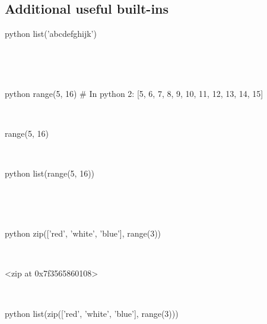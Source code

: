 \documentclass[aspectratio=1610,slidestop]{beamer}
\begin{document}
\subsection{Additional useful built-ins}
\begin{pframe}
 \begin{ipython}
  \begin{pythonin}{python}
list('abcdefghijk')
  \end{pythonin}
  \\
  \begin{pythonout}
['a', 'b', 'c', 'd', 'e', 'f', 'g', 'h', 'i', 'j', 'k']
  \end{pythonout}
  \\

  \begin{pythonin}{python}
range(5, 16)  # In python 2: [5, 6, 7, 8, 9, 10, 11, 12, 13, 14, 15]
  \end{pythonin}
  \\
  \begin{pythonout}
range(5, 16)
  \end{pythonout}
  \\

  \begin{pythonin}{python}
list(range(5, 16))
  \end{pythonin}
  \\
  \begin{pythonout}
[5, 6, 7, 8, 9, 10, 11, 12, 13, 14, 15]
  \end{pythonout}
  \\

  \begin{pythonin}{python}
zip(['red', 'white', 'blue'], range(3))
  \end{pythonin}
  \\
  \begin{pythonout}
<zip at 0x7f3565860108>
  \end{pythonout}
  \\

  \begin{pythonin}{python}
list(zip(['red', 'white', 'blue'], range(3)))
  \end{pythonin}
  \\
  \begin{pythonout}
  \end{pythonout}
 \end{ipython}
\end{pframe}
\end{document}

